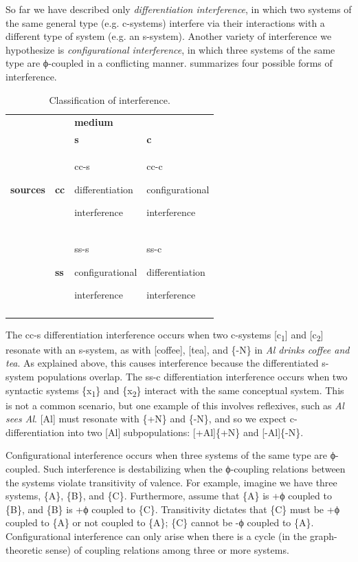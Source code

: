   So far we have described only \textit{differentiation interference}, in which two systems of the same general type (e.g. c-systems) interfere via their interactions with a different type of system (e.g. an s-system). Another variety of interference we hypothesize is \textit{configurational interference}, in which three systems of the same type are ϕ-coupled in a conflicting manner. {} summarizes four possible forms of interference.
  
\begin{table}
\begin{tabularx}{\textwidth}{llXX} 
\lsptoprule
&  & \textbf{medium} & \\
&  & \textbf{s} & \textbf{c}\\
\midrule 
\textbf{sources} & \textbf{cc} & cc-s

differentiation 

interference & cc-c

configurational

interference\\
\tablevspace
& \textbf{ss} & ss-s

configurational

interference & ss-c

differentiation

interference\\
\lspbottomrule
\end{tabularx}
\caption{Classification of interference.}\label{tab:4:2}
\end{table}
  The cc-s differentiation interference occurs when two c-systems [c\textsubscript{1}] and [c\textsubscript{2}] resonate with an s-system, as with [coffee], [tea], and \{-N\} in \textit{Al drinks coffee and tea}. As explained above, this causes interference because the differentiated s-system populations overlap. The ss-c differentiation interference occurs when two syntactic systems \{x\textsubscript{1}\} and \{x\textsubscript{2}\} interact with the same conceptual system. This is not a common scenario, but one example of this involves reflexives, such as \textit{Al sees Al}. [Al] must resonate with \{+N\} and \{-N\}, and so we expect c-differentiation into two [Al] subpopulations: [+Al]\{+N\} and [-Al]\{-N\}.

  Configurational interference occurs when three systems of the same type are ϕ-coupled. Such interference is destabilizing when the ϕ-coupling relations between the systems violate transitivity of valence. For example, imagine we have three systems, \{A\}, \{B\}, and \{C\}. Furthermore, assume that \{A\} is +ϕ coupled to \{B\}, and \{B\} is +ϕ coupled to \{C\}. Transitivity dictates that \{C\} must be +ϕ coupled to \{A\} or not coupled to \{A\}; \{C\} cannot be -ϕ coupled to \{A\}. Configurational interference can only arise when there is a cycle (in the graph-theoretic sense) of coupling relations among three or more systems. 

